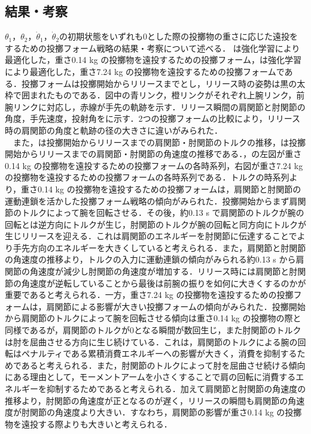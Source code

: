\begin{small}
\subsection{結果・考察}
$\theta_{1}$，$\theta_{2}$，$\dot{\theta}_{1}$，$\dot{\theta}_{2}$の初期状態をいずれも0とした際の投擲物の重さに応じた遠投をするための投擲フォーム戦略の結果・考察について述べる．
は強化学習により最適化した，重さ0.14 kg の投擲物を遠投するための投擲フォーム，は強化学習により最適化した，重さ7.24 kg の投擲物を遠投するための投擲フォームである．投擲フォームは投擲開始からリリースまでとし，リリース時の姿勢は黒の太枠で囲まれたものである．図中の青リンク，橙リンクがそれぞれ上腕リンク，前腕リンクに対応し，赤線が手先の軌跡を示す．リリース瞬間の肩関節と肘関節の角度，手先速度，投射角をに示す．2つの投擲フォームの比較により，リリース時の肩関節の角度と軌跡の径の大きさに違いがみられた．\\
　また，は投擲開始からリリースまでの肩関節・肘関節のトルクの推移，は投擲開始からリリースまでの肩関節・肘関節の角速度の推移である．，の左図が重さ0.14 kg の投擲物を遠投するための投擲フォームの各時系列，右図が重さ7.24 kg の投擲物を遠投するための投擲フォームの各時系列である．トルクの時系列より，重さ0.14 kg の投擲物を遠投するための投擲フォームは，肩関節と肘関節の運動連鎖を活かした投擲フォーム戦略の傾向がみられた．投擲開始からまず肩関節のトルクによって腕を回転させる．その後，約0.13 s で肩関節のトルクが腕の回転とは逆方向にトルクが生じ，肘関節のトルクが腕の回転と同方向にトルクが生じリリースを迎える．これは肩関節のエネルギーを肘関節に伝達することでより手先方向のエネルギーを大きくしていると考えられる．また，肩関節と肘関節の角速度の推移より，トルクの入力に運動連鎖の傾向がみられる約0.13 s から肩関節の角速度が減少し肘関節の角速度が増加する．リリース時には肩関節と肘関節の角速度が逆転していることから最後は前腕の振りを如何に大きくするのかが重要であると考えられる．一方，重さ7.24 kg の投擲物を遠投するための投擲フォームは，肩関節による影響が大きい投擲フォームの傾向がみられた．投擲開始から肩関節のトルクによって腕を回転させる傾向は重さ0.14 kg の投擲物の際と同様であるが，肩関節のトルクが0となる瞬間が数回生じ，また肘関節のトルクは肘を屈曲させる方向に生じ続けている．これは，肩関節のトルクによる腕の回転はペナルティである累積消費エネルギーへの影響が大きく，消費を抑制するためであると考えられる．また，肘関節のトルクによって肘を屈曲させ続ける傾向にある理由として，モーメントアームを小さくすることで肩の回転に消費するエネルギーを抑制するためであると考えられる．加えて肩関節と肘関節の角速度の推移より，肘関節の角速度が正となるのが遅く，リリースの瞬間も肩関節の角速度が肘関節の角速度より大きい．すなわち，肩関節の影響が重さ0.14 kg の投擲物を遠投する際よりも大きいと考えられる．\\

\end{small}
